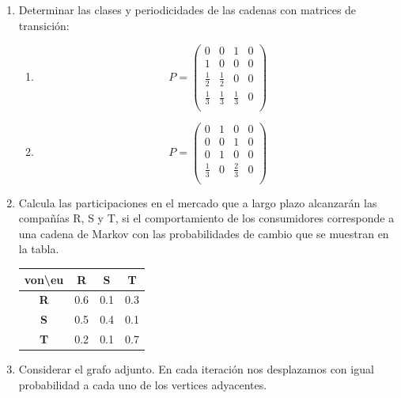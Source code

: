 \documentclass{templateNote}
\begin{document}
\begin{enumerate}
    \newpage
    \item Determinar las clases y periodicidades de las cadenas con matrices de transición:
    \begin{enumerate}[label=\alph*)]
        \item
        \[
        P = \left(
        \begin{array}{cccc}
            0           & 0           & 1           & 0\\
            1           & 0           & 0           & 0\\
            \frac{1}{2} & \frac{1}{2} & 0           & 0\\
            \frac{1}{3} & \frac{1}{3} & \frac{1}{3} & 0\\
        \end{array}
        \right)
        \]
        \item
        \[
        P = \left(
        \begin{array}{cccc}
            0           & 1 & 0           & 0\\
            0           & 0 & 1           & 0\\
            0           & 1 & 0           & 0\\
            \frac{1}{3} & 0 & \frac{2}{3} & 0\\
        \end{array}
        \right)
        \]
    \end{enumerate}

    \newpage
    \item Calcula las participaciones en el mercado que a largo plazo alcanzarán las compañías R, S y T, si el comportamiento de los consumidores corresponde a una cadena de Markov con las probabilidades de cambio que se muestran en la tabla.
        \begin{center}
            \begin{tabular}{|c|c|c|c|}
                \hline
                von\textbackslash eu & \textbf{R} & \textbf{S} & \textbf{T} \\ \hline
                \textbf{R} & 0.6 & 0.1 & 0.3 \\
                \textbf{S} & 0.5 & 0.4 & 0.1 \\ 
                \textbf{T} & 0.2 & 0.1 & 0.7 \\ \hline
            \end{tabular}
        \end{center}
    
    \newpage
    \item Considerar el grafo adjunto. En cada iteración nos desplazamos con igual probabilidad a cada uno de los vertices adyacentes.
    \begin{center}
\end{center}
\end{enumerate}
\end{document}
